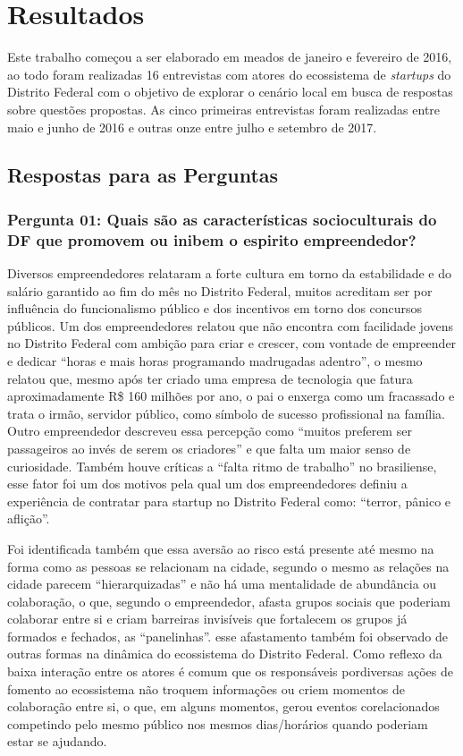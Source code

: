 \chapter[Resultados]{Resultados}
\label{cap-resultados}

Este trabalho começou a ser elaborado em meados de janeiro e fevereiro de 2016, ao todo foram realizadas 16 entrevistas com atores do ecossistema de \textit{startups} do Distrito Federal com o objetivo de explorar o cenário local em busca de respostas sobre questões propostas. As cinco primeiras entrevistas foram realizadas entre maio e junho de 2016 e outras onze entre julho e setembro de 2017.

\section{Respostas para as Perguntas}
\label{section:perguntas_de_pesquisa}

\subsection*{Pergunta 01: Quais são as características socioculturais do DF que promovem ou inibem o espirito empreendedor?}
\label{subsection:pergunta_de_pesquisa_1}

Diversos empreendedores relataram a forte cultura em torno da estabilidade e do salário garantido ao fim do mês no Distrito Federal, muitos acreditam ser por influência do funcionalismo público e dos incentivos em torno dos concursos públicos. Um dos empreendedores relatou que não encontra com facilidade jovens no Distrito Federal com ambição para criar e crescer, com vontade de empreender e dedicar ``horas e mais horas programando madrugadas adentro'', o mesmo relatou que, mesmo após ter criado uma empresa de tecnologia que fatura aproximadamente R\$ 160 milhões por ano, o pai o enxerga como um fracassado e trata o irmão, servidor público, como símbolo de sucesso profissional na família. Outro empreendedor descreveu essa percepção como ``muitos preferem ser passageiros ao invés de serem os criadores'' e que falta um maior senso de curiosidade. Também houve críticas a ``falta ritmo de trabalho'' no brasiliense, esse fator foi um dos motivos pela qual um dos empreendedores definiu a experiência de contratar para startup no Distrito Federal como: ``terror, pânico e aflição''. 

Foi identificada também que essa aversão ao risco está presente até mesmo na forma como as pessoas se relacionam na cidade, segundo o mesmo as relações na cidade parecem ``hierarquizadas'' e não há uma mentalidade de abundância ou colaboração, o que, segundo o empreendedor, afasta grupos sociais que poderiam colaborar entre si e criam barreiras invisíveis que fortalecem os grupos já formados e fechados, as ``panelinhas''. esse afastamento também foi observado de outras formas na dinâmica do ecossistema do Distrito Federal. Como reflexo da baixa interação entre os atores é comum que os responsáveis pordiversas ações de fomento ao ecossistema não troquem informações ou criem momentos de colaboração entre si, o que, em alguns momentos, gerou eventos corelacionados competindo pelo mesmo público nos mesmos dias/horários quando poderiam estar se ajudando.

